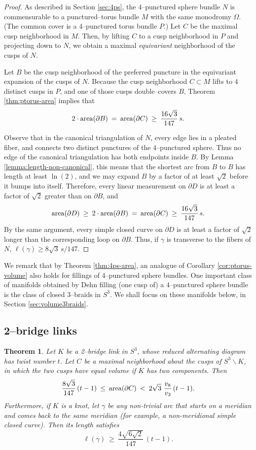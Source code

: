 \documentclass[11pt]{amsart}
\renewcommand{\setminus}{{\smallsetminus}}
\newcommand{\area}{{\rm area}}
\newcommand{\bdy}{{\partial}}
\theoremstyle{plain}
\newtheorem{theorem}{Theorem}[section]
\theoremstyle{definition}
\begin{document}
\begin{proof}
As described in Section \ref{sec:4ps}, the $4$--punctured sphere
bundle $N$ is commensurable to a punctured--torus bundle $M$ with the
same monodromy $\Omega$.  (The common cover is a $4$--punctured torus
bundle $P$.)  Let $C$ be the maximal cusp neighborhood in $M$. Then,
by lifting $C$ to a cusp neighborhood in $P$ and projecting down to
$N$, we obtain a maximal \emph{equivariant} neighborhood of the cusps
of $N$.

Let $B$ be the cusp neighborhood of the preferred puncture in the
equivariant expansion of the cusps of $N$.  Because the cusp
neighborhood $C \subset M$ lifts to 4 distinct cusps in $P$, and one
of those cusps double--covers $B$, Theorem \ref{thm:ptorus-area}
implies that
$$ 2 \cdot \area(\bdy B) \: = \: \area(\bdy C) \: \geq \: \frac{16
\sqrt{3}}{147} \, s.$$

Observe that in the canonical triangulation of $N$, every edge lies in
a pleated fiber, and connects two distinct punctures of the
$4$--punctured sphere.  Thus no edge of the canonical triangulation
has both endpoints inside $B$.  By Lemma
\ref{lemma:length-non-canonical}, this means that the shortest arc
from $B$ to $B$ has length at least $\ln(2)$, and we may expand $B$ by
a factor of at least $\sqrt{2}$ before it bumps into itself.
Therefore, every linear measurement on $\bdy D$ is at least a factor
of $\sqrt{2}$ greater than on $\bdy B$, and
$$ \area(\bdy D) \: \geq \: 2 \cdot \area(\bdy B) \: = \: \area(\bdy
C) \: \geq \: \frac{16 \sqrt{3}}{147} \, s.$$
%
By the same argument, every simple closed curve on $\bdy D$ is at
least a factor of $\sqrt{2}$ longer than the corresponding loop on
$\bdy B$.  Thus, if $\gamma$ is transverse to the fibers of $N$, $
\ell(\gamma) \geq 8\sqrt{3} \, s/147$.
\end{proof}

We remark that by Theorem \ref{thm:4ps-area}, an analogue of Corollary
\ref{cor:ptorus-volume} also holds for fillings of 4--punctured sphere
bundles.  One important class of manifolds obtained by Dehn filling
(one cusp of) a $4$--punctured sphere bundle is the class of closed
3--braids in $S^3$.  We shall focus on these manifolds below, in
Section \ref{sec:volume3braids}.

\subsection{2--bridge links}

\begin{theorem}\label{thm:2bridge}
Let $K$ be a 2--bridge link in $S^3$, whose reduced alternating
diagram has twist number $t$.  Let $C$ be a maximal neighborhood about
the cusps of $S^3 \setminus K$, in which the two cusps have equal
volume if $K$ has two components.  Then
$$\frac{8\sqrt{3}}{147}\,(t-1) \: \leq \: \area(\bdy C) \: <\:
2\sqrt{3}\,\, \frac{v_8}{v_3}\,(t-1).$$
%
Furthermore, if $K$ is a knot, let $\gamma$ be any non-trivial arc
that starts on a meridian and comes back to the same meridian (for
example, a non-meridional simple closed curve). Then its length
satisfies
$$\ell(\gamma) \: \geq \: \frac{4\sqrt{6\sqrt{2}}}{147}\, (t-1).$$
\end{theorem}
\end{document}
